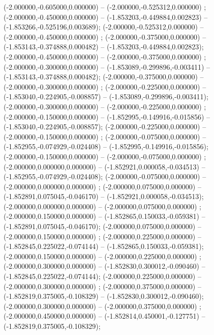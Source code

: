  (-2.000000,-0.605000,0.000000) -- (-2.000000,-0.525312,0.000000) ;
 (-2.000000,-0.450000,0.000000) -- (-1.853203,-0.449884,0.002823) -- (-1.853266,-0.525196,0.003689);
 (-2.000000,-0.525312,0.000000) -- (-2.000000,-0.450000,0.000000) ;
 (-2.000000,-0.375000,0.000000) -- (-1.853143,-0.374888,0.000482) -- (-1.853203,-0.449884,0.002823);
 (-2.000000,-0.450000,0.000000) -- (-2.000000,-0.375000,0.000000) ;
 (-2.000000,-0.300000,0.000000) -- (-1.853089,-0.299896,-0.003411) -- (-1.853143,-0.374888,0.000482);
 (-2.000000,-0.375000,0.000000) -- (-2.000000,-0.300000,0.000000) ;
 (-2.000000,-0.225000,0.000000) -- (-1.853040,-0.224905,-0.008857) -- (-1.853089,-0.299896,-0.003411);
 (-2.000000,-0.300000,0.000000) -- (-2.000000,-0.225000,0.000000) ;
 (-2.000000,-0.150000,0.000000) -- (-1.852995,-0.149916,-0.015856) -- (-1.853040,-0.224905,-0.008857);
 (-2.000000,-0.225000,0.000000) -- (-2.000000,-0.150000,0.000000) ;
 (-2.000000,-0.075000,0.000000) -- (-1.852955,-0.074929,-0.024408) -- (-1.852995,-0.149916,-0.015856);
 (-2.000000,-0.150000,0.000000) -- (-2.000000,-0.075000,0.000000) ;
 (-2.000000,0.000000,0.000000) -- (-1.852921,0.000058,-0.034513) -- (-1.852955,-0.074929,-0.024408);
 (-2.000000,-0.075000,0.000000) -- (-2.000000,0.000000,0.000000) ;
 (-2.000000,0.075000,0.000000) -- (-1.852891,0.075045,-0.046170) -- (-1.852921,0.000058,-0.034513);
 (-2.000000,0.000000,0.000000) -- (-2.000000,0.075000,0.000000) ;
 (-2.000000,0.150000,0.000000) -- (-1.852865,0.150033,-0.059381) -- (-1.852891,0.075045,-0.046170);
 (-2.000000,0.075000,0.000000) -- (-2.000000,0.150000,0.000000) ;
 (-2.000000,0.225000,0.000000) -- (-1.852845,0.225022,-0.074144) -- (-1.852865,0.150033,-0.059381);
 (-2.000000,0.150000,0.000000) -- (-2.000000,0.225000,0.000000) ;
 (-2.000000,0.300000,0.000000) -- (-1.852830,0.300012,-0.090460) -- (-1.852845,0.225022,-0.074144);
 (-2.000000,0.225000,0.000000) -- (-2.000000,0.300000,0.000000) ;
 (-2.000000,0.375000,0.000000) -- (-1.852819,0.375005,-0.108329) -- (-1.852830,0.300012,-0.090460);
 (-2.000000,0.300000,0.000000) -- (-2.000000,0.375000,0.000000) ;
 (-2.000000,0.450000,0.000000) -- (-1.852814,0.450001,-0.127751) -- (-1.852819,0.375005,-0.108329);
